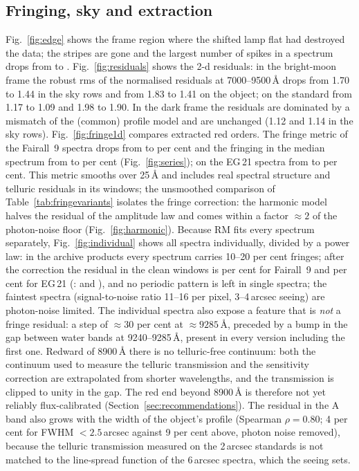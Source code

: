 \subsection{Fringing, sky and extraction}
\label{sec:results_fringe}
Fig.~\ref{fig:edge} shows the frame region where the shifted lamp flat had destroyed the data; the stripes are gone
and the largest number of spikes in a spectrum drops from \SpMaxOld{} to \SpMaxNew. Fig.~\ref{fig:residuals} shows the
2-d residuals: in the bright-moon frame the robust rms of the normalised residuals at 7000--9500\,\AA{} drops from
1.70 to 1.44 in the sky rows and from 1.83 to 1.41 on the object; on the standard from 1.17 to 1.09 and 1.98 to 1.90.
In the dark frame the residuals are dominated by a mismatch of the (common) profile model and are unchanged (1.12 and
1.14 in the sky rows). Fig.~\ref{fig:fringe1d} compares extracted red orders. The fringe metric of the Fairall~9 spectra
drops from \FrOld{} to \FrNewOpt{} per cent and the fringing in the median spectrum from \FrMedOld{} to \FrMedNewOpt{}
per cent (Fig.~\ref{fig:series}); on the EG\,21 spectra from \EGfrOld{} to \EGfrNew{} per cent. This metric
smooths over 25\,\AA{} and includes real spectral structure and telluric residuals in its windows; the unsmoothed
comparison of Table~\ref{tab:fringevariants} isolates the fringe correction: the harmonic model halves the residual
of the amplitude law and comes within a factor $\approx2$ of the photon-noise floor (Fig.~\ref{fig:harmonic}). Because RM fits every
spectrum separately, Fig.~\ref{fig:individual} shows all spectra individually, divided by a power law: in the archive
products every spectrum carries 10--20 per cent fringes; after the correction the residual in the clean windows is
\IndivNewF{} per cent for Fairall~9 and \IndivNewE{} per cent for EG\,21 (\banzai: \IndivOldF{} and \IndivOldE), and no
periodic pattern is left in single spectra; the faintest spectra (signal-to-noise ratio 11--16 per pixel, 3--4\,arcsec
seeing) are photon-noise limited. The individual spectra also expose a feature that is \emph{not} a fringe residual:
a step of $\approx30$ per cent at $\approx9285$\,\AA{}, preceded by a bump in the gap between water bands at
9240--9285\,\AA, present in every version including the first one. Redward of 8900\,\AA{} there is no telluric-free
continuum: both the continuum used to measure the telluric transmission and the sensitivity correction are extrapolated
from shorter wavelengths, and the transmission is clipped to unity in the gap. The red end beyond 8900\,\AA{} is
therefore not yet reliably flux-calibrated (Section~\ref{sec:recommendations}). The residual in the A band also grows
with the width of the object's profile (Spearman $\rho=0.80$; 4 per cent for FWHM $<2.5$\,arcsec against 9 per cent
above, photon noise removed), because the telluric transmission measured on the 2\,arcsec standards is not matched to
the line-spread function of the 6\,arcsec spectra, which the seeing sets.

